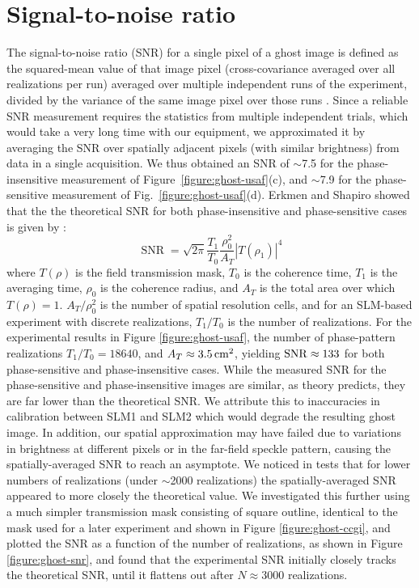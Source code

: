 \section{Signal-to-noise ratio}
The signal-to-noise ratio (SNR) for a single pixel of a ghost image is defined as the squared-mean value of that image pixel (cross-covariance averaged over all realizations per run) averaged over multiple independent runs of the experiment, divided by the variance of the same image pixel over those runs \cite{erkmen-unified}. Since a reliable SNR measurement requires the statistics from multiple independent trials, which would take a very long time with our equipment, we approximated it by averaging the SNR over spatially adjacent pixels (with similar brightness) from data in a single acquisition. We thus obtained an SNR of $\sim$7.5 for the phase-insensitive measurement of Figure~\ref{figure:ghost-usaf}(c), and $\sim$7.9 for the phase-sensitive measurement of Fig.~\ref{figure:ghost-usaf}(d). Erkmen and Shapiro showed that the the theoretical SNR for both phase-insensitive and phase-sensitive cases is given by \cite{erkmen-signal,erkmen-from}:
\begin{equation}
\operatorname{SNR} = \sqrt{2\pi} \frac{T_1}{T_0} \frac{\rho_0^2}{A_T} |T(\rho_1)|^4
\end{equation}
where $T(\rho)$ is the field transmission mask, $T_0$ is the coherence time, $T_1$ is the averaging time, $\rho_0$ is the coherence radius, and $A_T$ is the total area over which $T(\rho) = 1$. $A_T/\rho_0^2$ is the number of spatial resolution cells, and for an SLM-based experiment with discrete realizations, $T_1/T_0$ is the number of realizations. For the experimental results in Figure \ref{figure:ghost-usaf}, the number of phase-pattern realizations $T_1/T_0 = 18640$, and $A_T \approx 3.5\,{\rm cm}^2$, yielding  ${\rm SNR}\approx 133$ for both phase-sensitive and phase-insensitive cases. While the measured SNR for the phase-sensitive and phase-insensitive images are similar, as theory predicts, they are far lower than the theoretical SNR. We attribute this to inaccuracies in calibration between SLM1 and SLM2 which would degrade the resulting ghost image. In addition, our spatial approximation may have failed due to variations in brightness at different pixels or in the far-field speckle pattern, causing the spatially-averaged SNR to reach an asymptote. We noticed in tests that for lower numbers of realizations (under $\sim$2000 realizations) the spatially-averaged SNR appeared to more closely the theoretical value. We investigated this further using a much simpler transmission mask consisting of square outline, identical to the mask used for a later experiment and shown in Figure \ref{figure:ghost-ccgi}, and plotted the SNR as a function of the number of realizations, as shown in Figure \ref{figure:ghost-snr}, and found that the experimental SNR initially closely tracks the theoretical SNR, until it flattens out after $N \approx 3000$ realizations.

